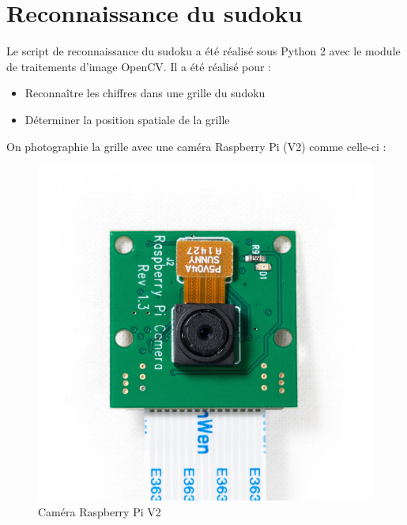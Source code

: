 \documentclass[12pt,a4paper]{report}
\begin{document}
\section{Reconnaissance du sudoku}
	Le script de reconnaissance du sudoku a été réalisé sous Python 2 avec le module de traitements d'image OpenCV. Il a été réalisé pour :
	\begin{itemize}[label=--]
	\item Reconnaître les chiffres dans une grille du sudoku
	\item Déterminer la position spatiale de la grille
	\end{itemize}
	On photographie la grille avec une caméra Raspberry Pi (V2) comme celle-ci :
\begin{figure}[!h]
 \center
 \includegraphics[scale=0.2]{../pictures/camera.jpg}
 \caption{Caméra Raspberry Pi V2}
\end{figure}
\end{document}

